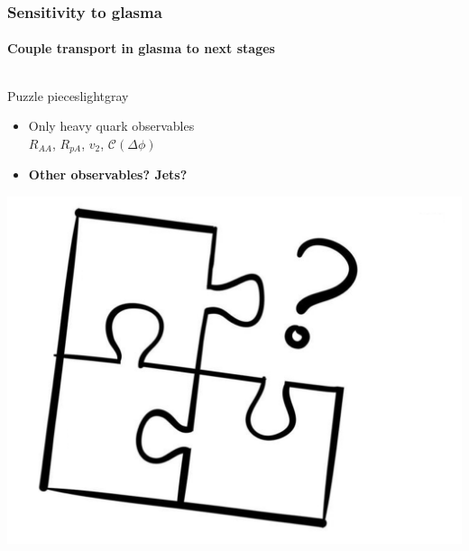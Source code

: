 \documentclass[aspectratio=169,11pt,usenames,dvipsnames]{beamer}
\begin{document}
\begin{frame}
    \frametitle{Sensitivity to glasma}
    \framesubtitle{Couple transport in glasma to next stages}
    \vspace{-20pt}
    \begin{center}
        \begin{columns}[onlytextwidth,t]
            \begin{center}
            \begin{custombox2}{\normalsize Puzzle pieces}{lightgray}
                \small
                \begin{varwidth}{0.82\textwidth}
                \begin{itemize}\itemsep0em 
                    \itemsep0em
                    \footnotesize
                    \item Only heavy quark observables\\ $R_{AA}$, $R_{pA}$, $v_2$, $\mathcal{C}(\Delta\phi)$
                     \item {\bfseries\color{jyured} Other observables? Jets?}
                \end{itemize}
                \end{varwidth}
            \end{custombox2}

                \includegraphics[width=0.55\columnwidth]{images/puzzle.png}
            \end{center}


\end{columns}
\end{center}
\end{frame}
\end{document}
